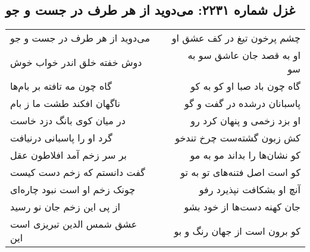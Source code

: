 \begin{center}
\section*{غزل شماره ۲۲۳۱: می‌دوید از هر طرف در جست و جو}
\label{sec:2231}
\begin{longtable}{l p{0.5cm} r}
می‌دوید از هر طرف در جست و جو
&&
چشم پرخون تیغ در کف عشق او
\\
دوش خفته خلق اندر خواب خوش
&&
او به قصد جان عاشق سو به سو
\\
گاه چون مه تافته بر بام‌ها
&&
گاه چون باد صبا او کو به کو
\\
ناگهان افکند طشت ما ز بام
&&
پاسبانان درشده در گفت و گو
\\
در میان کوی بانگ دزد خاست
&&
او بزد زخمی و پنهان کرد رو
\\
گرد او را پاسبانی درنیافت
&&
کش زبون گشته‌ست چرخ تندخو
\\
بر سر زخم آمد افلاطون عقل
&&
کو نشان‌ها را بداند مو به مو
\\
گفت دانستم که زخم دست کیست
&&
کو است اصل فتنه‌های تو به تو
\\
چونک زخم او است نبود چاره‌ای
&&
آنچ او بشکافت نپذیرد رفو
\\
از پی این زخم جان نو رسید
&&
جان کهنه دست‌ها از خود بشو
\\
عشق شمس الدین تبریزی است این
&&
کو برون است از جهان رنگ و بو
\\
\end{longtable}
\end{center}
